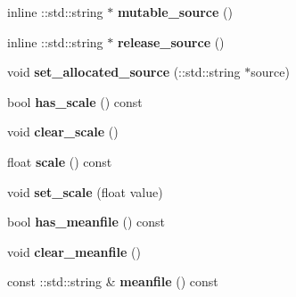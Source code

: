 \begin{DoxyCompactItemize}
\mbox{\label{classcaffe_1_1_v0_layer_parameter_adf49b08c068614e5fb120dc5e1aa7757}} 
inline \+::std\+::string $\ast$ {\bfseries mutable\+\_\+source} ()
\item 
\mbox{\label{classcaffe_1_1_v0_layer_parameter_a33a8b0904f9efcb4cb833fd9327093da}} 
inline \+::std\+::string $\ast$ {\bfseries release\+\_\+source} ()
\item 
\mbox{\label{classcaffe_1_1_v0_layer_parameter_a19a560c448a09cf579973e2e2a9a61bd}} 
void {\bfseries set\+\_\+allocated\+\_\+source} (\+::std\+::string $\ast$source)
\item 
\mbox{\label{classcaffe_1_1_v0_layer_parameter_a563aff74e01497f7ebbeab86b66cceb5}} 
bool {\bfseries has\+\_\+scale} () const
\item 
\mbox{\label{classcaffe_1_1_v0_layer_parameter_a8f0c6089d61a100fcec6364a2f9d06ef}} 
void {\bfseries clear\+\_\+scale} ()
\item 
\mbox{\label{classcaffe_1_1_v0_layer_parameter_adddb90d621352011968ba96530d176ef}} 
float {\bfseries scale} () const
\item 
\mbox{\label{classcaffe_1_1_v0_layer_parameter_ac4cde99767802197662ab260dfa8cf44}} 
void {\bfseries set\+\_\+scale} (float value)
\item 
\mbox{\label{classcaffe_1_1_v0_layer_parameter_a9aea3c0076381883cc507dd77a5b1f43}} 
bool {\bfseries has\+\_\+meanfile} () const
\item 
\mbox{\label{classcaffe_1_1_v0_layer_parameter_a917a53ca287f2a405d18812d2ec82ca0}} 
void {\bfseries clear\+\_\+meanfile} ()
\item 
\mbox{\label{classcaffe_1_1_v0_layer_parameter_a200b23017f87064574a4d5649e0e80e2}} 
const \+::std\+::string \& {\bfseries meanfile} () const
\item 

\end{DoxyCompactItemize}
